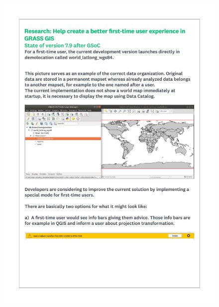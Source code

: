 \documentclass[a4paper,10pt,twoside]{article}
\begin{document}
 \newpage
 \begin{figure}[hbt!]
 \begin{center}
 \includegraphics[width=16cm]{../surveys/questionnaires/survey1_part2_page2_state_after_gsoc.pdf}
 \end{center}
 \end{figure}
 
\end{document}
